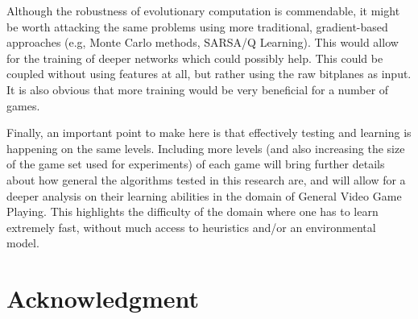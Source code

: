 \documentclass[conference]{IEEEtran}
\begin{document}
Although the robustness of evolutionary computation is commendable, it might be worth attacking the same problems using more traditional, gradient-based approaches (e.g, Monte Carlo methods, SARSA/Q Learning). This would allow for the training of deeper networks which could possibly help. This could be coupled without using features at all, but rather using the raw bitplanes as input. It is also obvious that more training would be very beneficial for a number of games. 

Finally, an important point to make here is that effectively testing and learning is happening on the same levels. Including more levels (and also increasing the size of the game set used for experiments) of each game will bring further details about how general the algorithms tested in this research are, and will allow for a deeper analysis on their learning abilities in the domain of General Video Game Playing. This highlights the  difficulty of the domain where one has to learn extremely fast, without much access to heuristics and/or an environmental model. 

 
\section*{Acknowledgment}



 



\end{document}
